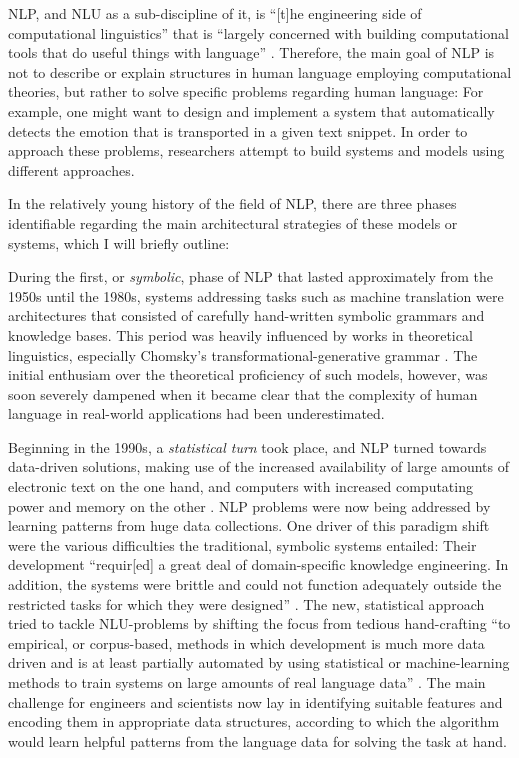 

NLP, and NLU as a sub-discipline of it, is ``[t]he engineering side of computational
linguistics'' that is ``largely concerned with building computational tools that do useful
things with language'' \cite{johnson2009statistical}. Therefore, the main goal of NLP is
not to describe or explain structures in human language employing computational theories,
but rather to solve specific problems regarding human language: For example, one might want
to design and implement a system that automatically detects the emotion that is transported
in a given text snippet. In order to approach these problems, researchers attempt to build
systems and models using different approaches.

In the relatively young history of the field of NLP, there are three phases identifiable
regarding the main architectural strategies of these models or systems, which I will briefly
outline:

During the first, or \emph{symbolic}, phase of NLP that lasted approximately from the 1950s
until the 1980s, systems addressing tasks such as machine translation were architectures that
consisted of carefully hand-written symbolic grammars and knowledge bases. This period was heavily
influenced by works in theoretical linguistics, especially Chomsky's transformational-generative
grammar \citep{chomsky2009syntactic,chomsky2014aspects}. The initial enthusiam over the theoretical
proficiency of such models, however, was soon severely dampened when it became clear
that the complexity of human language in real-world applications had been underestimated.


Beginning in the 1990s, a \emph{statistical turn} took place, and NLP turned towards
data-driven solutions, making use of the increased availability of large amounts of
electronic text on the one hand, and computers with increased computating power and
memory on the other \citep{liddy2001natural}. NLP problems were now being addressed
by learning patterns from huge data collections. One driver of this paradigm shift
were the various difficulties the traditional, symbolic systems entailed: Their
development ``requir[ed] a great deal of domain-specific knowledge engineering. In
addition, the systems were brittle and could not function adequately outside the
restricted tasks for which they were designed'' \citep[p.~13]{brill1997overview}.
The new, statistical {\color{red} approach} tried to tackle NLU-problems by shifting
the focus from tedious hand-crafting ``to empirical, or corpus-based, methods in
which development is much more data driven and is at least partially automated by
using statistical or machine-learning methods to train systems on large amounts
of real language data'' \citep[p.~13]{brill1997overview}. The main challenge for
engineers and scientists now lay in identifying suitable features and encoding them
in appropriate data structures, according to which the algorithm would learn helpful
patterns from the language data for solving the task at hand.


